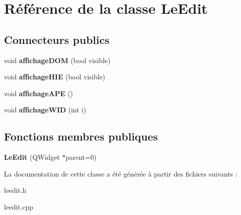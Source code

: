 \hypertarget{classLeEdit}{
\section{Référence de la classe LeEdit}
\label{classLeEdit}
}
\subsection*{Connecteurs publics}
\begin{DoxyCompactItemize}
\item 
\hypertarget{classLeEdit_a093399eb39cfb60f825ecbc6ab5ae096}{
void {\bfseries affichageDOM} (bool visible)}
\label{classLeEdit_a093399eb39cfb60f825ecbc6ab5ae096}

\item 
\hypertarget{classLeEdit_ad4ae5c310f20d825dc582f8370f9069d}{
void {\bfseries affichageHIE} (bool visible)}
\label{classLeEdit_ad4ae5c310f20d825dc582f8370f9069d}

\item 
\hypertarget{classLeEdit_afa90a24cb83a1302a4ed9dd249e996b1}{
void {\bfseries affichageAPE} ()}
\label{classLeEdit_afa90a24cb83a1302a4ed9dd249e996b1}

\item 
\hypertarget{classLeEdit_a7d6a5fccc38fb0edde64aa3572e8b44d}{
void {\bfseries affichageWID} (int i)}
\label{classLeEdit_a7d6a5fccc38fb0edde64aa3572e8b44d}

\end{DoxyCompactItemize}
\subsection*{Fonctions membres publiques}
\begin{DoxyCompactItemize}
\item 
\hypertarget{classLeEdit_a135617402621e814b450a731e96e02fc}{
{\bfseries LeEdit} (QWidget $\ast$parent=0)}
\label{classLeEdit_a135617402621e814b450a731e96e02fc}

\end{DoxyCompactItemize}


La documentation de cette classe a été générée à partir des fichiers suivants :\begin{DoxyCompactItemize}
\item 
leedit.h\item 
leedit.cpp\end{DoxyCompactItemize}
